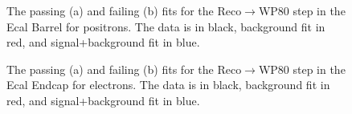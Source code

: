 \begin{thebibliography}{10}
\begin{figure}[htb]
  \begin{center}
    \caption{The passing (a) and failing (b) fits for the Reco$\to$WP80 step in the Ecal Barrel for positrons.
             The data is in black, background fit in red, and signal+background fit in blue.}
  \end{center}
\end{figure}

\begin{figure}[htb]
  \begin{center}
    \caption{The passing (a) and failing (b) fits for the Reco$\to$WP80 step in the Ecal Endcap for electrons.
             The data is in black, background fit in red, and signal+background fit in blue.}
  \end{center}
\end{figure}


\end{thebibliography}
